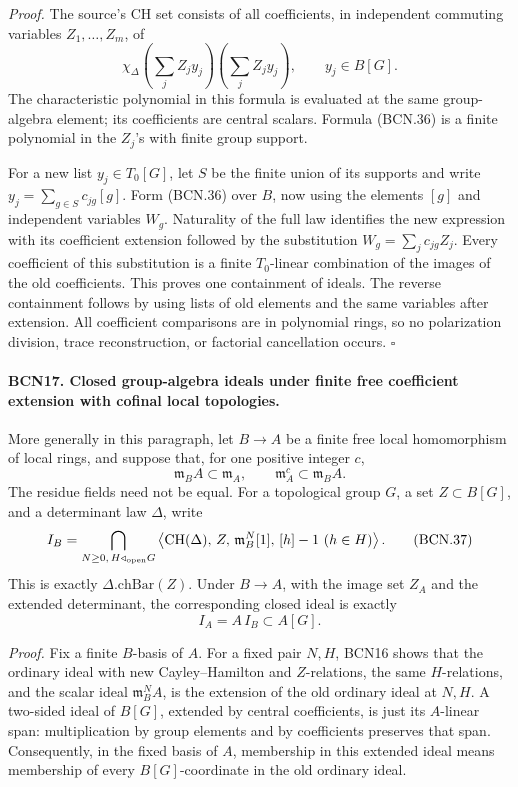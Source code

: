 \emph{Proof.}
The source's \(\mathrm{CH}\) set consists of all coefficients,
in independent commuting variables \(Z_1,\ldots,Z_m\), of
\[
 \chi_\Delta\!\left(\sum_j Z_jy_j\right)
                \!\left(\sum_j Z_jy_j\right),
 \qquad y_j\in B[G].                                           \tag{BCN.36}
\]
The characteristic polynomial in this formula is evaluated
at the same group-algebra element; its coefficients are
central scalars.  Formula (BCN.36) is a finite polynomial
in the \(Z_j\)'s with finite group support.

For a new list \(y_j\in T_0[G]\), let \(S\) be the finite
union of its supports and write
\(y_j=\sum_{g\in S}c_{jg}[g]\).
Form (BCN.36) over \(B\), now using the elements \([g]\)
and independent variables \(W_g\).  Naturality of the full
law identifies the new expression with its coefficient
extension followed by the substitution
\(W_g=\sum_j c_{jg}Z_j\).
Every coefficient of this substitution is a finite
\(T_0\)-linear combination of the images of the old
coefficients.  This proves one containment of ideals.
The reverse containment follows by using lists of
old elements and the same variables after extension.
All coefficient comparisons are in polynomial rings,
so no polarization division, trace reconstruction,
or factorial cancellation occurs.
\hfill\(\square\)

\paragraph{BCN17. Closed group-algebra ideals under finite free
coefficient extension with cofinal local topologies.}\label{claim:BCN17}
More generally in this paragraph, let \(B\to A\) be a finite
free local homomorphism of local rings, and suppose that,
for one positive integer \(c\),
\[
 \mathfrak m_B A\subset\mathfrak m_A,\qquad
 \mathfrak m_A^c\subset\mathfrak m_B A.                         \tag{BCN.37a}
\]
The residue fields need not be equal.
For a topological group \(G\), a set \(Z\subset B[G]\), and
a determinant law \(\Delta\), write
\[
 I_B=
 \bigcap_{N\ge0,\,H\triangleleft_{\rm open}G}
 \left\langle
  \mathrm{CH}(\Delta),\,Z,\,\mathfrak m_B^N[1],\,
  [h]-1\ (h\in H)\right\rangle .                              \tag{BCN.37}
\]
This is exactly \(\Delta.\mathrm{chBar}(Z)\).
Under \(B\to A\), with the image set \(Z_A\) and
the extended determinant, the corresponding closed ideal
is exactly
\[
 I_A=A\,I_B\subset A[G].                                        \tag{BCN.38}
\]

\emph{Proof.}
Fix a finite \(B\)-basis of \(A\).
For a fixed pair \(N,H\), BCN16 shows that the ordinary
ideal with new Cayley--Hamilton and \(Z\)-relations,
the same \(H\)-relations, and the scalar ideal
\(\mathfrak m_B^N A\), is the extension of the old
ordinary ideal at \(N,H\).
A two-sided ideal of \(B[G]\), extended by central
coefficients, is just its \(A\)-linear span: multiplication
by group elements and by coefficients preserves that span.
Consequently, in the fixed basis of \(A\), membership in
this extended ideal means membership of every
\(B[G]\)-coordinate in the old ordinary ideal.

